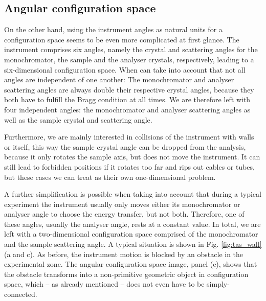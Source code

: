 \subsection{Angular configuration space}
On the other hand, using the instrument angles as natural units for a configuration
space seems to be even more complicated at first glance. 
The instrument comprises six angles, namely the crystal and 
scattering angles for the monochromator, the sample and the analyser crystals, 
respectively, leading to a six-dimensional configuration space. 
When can take into account that not all angles are independent of one another:
The monochromator and analyser scattering angles are always double their 
respective crystal angles, because they both have to fulfill the Bragg condition
at all times. 
We are therefore left with four independent angles: the monochromator and analyser
scattering angles as well as the sample crystal and scattering angle. 

Furthermore, we are mainly interested in collisions of the instrument with walls 
or itself, this way the sample crystal angle can be dropped from the analysis, 
because it only rotates the sample axis, but does not move the instrument. 
It can still lead to forbidden positions if it rotates too far and rips out cables 
or tubes, but these cases we can treat as their own one-dimensional problem. 

A further simplification is possible when taking into account that during a 
typical experiment the instrument usually only moves either its monochromator 
or analyser angle to choose the energy transfer, but not both. 
Therefore, one of these angles, usually the analyser angle, rests at a constant 
value. In total, we are left with a two-dimensional configuration space comprised 
of the monochromator and the sample scattering angle. 
A typical situation is shown in Fig. \ref{fig:tas_wall} (a and c). 
As before, the instrument motion is blocked by an obstacle in the experimental zone. 
The angular configuration space image, panel (c), shows that the obstacle 
transforms into a non-primitive geometric object in configuration space, 
which -- as already mentioned -- does not even have to be simply-connected.

